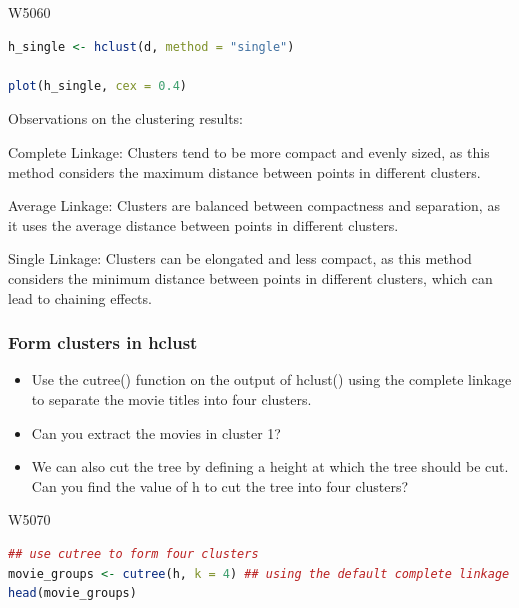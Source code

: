 
\begin{ocg}{}{W506}{0}
\begin{lstlisting}[language = R]
h_single <- hclust(d, method = "single") 

plot(h_single, cex = 0.4)
\end{lstlisting}
\end{ocg}

Observations on the clustering results:

Complete Linkage: Clusters tend to be more compact and evenly sized, as this method considers the maximum distance between points in different clusters.

Average Linkage: Clusters are balanced between compactness and separation, as it uses the average distance between points in different clusters.

Single Linkage: Clusters can be elongated and less compact, as this method considers the minimum distance between points in different clusters, which can lead to chaining effects.

\subsubsection{Form clusters in hclust}

\indent 

\begin{itemize}
    \item Use the cutree() function on the output of hclust() using the complete linkage to separate the movie titles into four clusters.
    \item Can you extract the movies in cluster 1?
    \item We can also cut the tree by defining a height at which the tree should be cut. Can you find the value of h to cut the tree into four clusters?
\end{itemize}


\begin{ocg}{}{W507}{0}
\begin{lstlisting}[language = R]
## use cutree to form four clusters 
movie_groups <- cutree(h, k = 4) ## using the default complete linkage
head(movie_groups)
\end{lstlisting}
\end{ocg}


